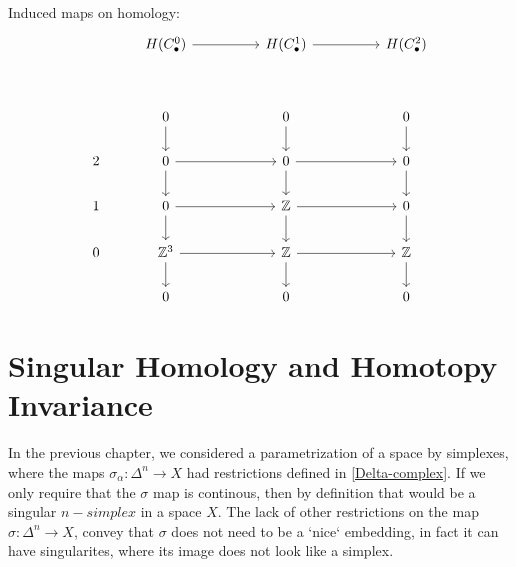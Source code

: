\documentclass[11pt,a4paper]{report}
\begin{document}
        Induced maps on homology:
       \[             
     \begin{tikzcd}[ampersand replacement=\&]
            \& H(C_\bullet^0)   \arrow[rr]                                     \&  \& H(C_\bullet^1) \arrow[rr]                               \&  \& H(C_\bullet^2)                                                                 \\ \\
            \& 0 \arrow[d]                                         \&  \& 0 \arrow[d]                                         \&  \& 0 \arrow[d]                                                                 \\ 
            2 \& 0 \arrow[rr] \arrow[d]            \&  \& 0 \arrow[rr] \arrow[d]            \&  \& 0 \arrow[d] \\
            1 \& 0 \arrow[d] \arrow[rr]            \&  \& \mathbb{Z} \arrow[rr] \arrow[d]                   \&  \& 0 \arrow[d]                                              \\
            0 \& \mathbb{Z}^3 \arrow[d] \arrow[rr] \&  \& \mathbb{Z} \arrow[rr] \arrow[d] \&  \& \mathbb{Z} \arrow[d]                                    \\
            \& 0                                                   \&  \& 0                                                   \&  \& 0                                                                          
    \end{tikzcd}
         \]           
                    
     \chapter{Singular Homology and Homotopy Invariance}
     
     
     In the previous chapter, we considered a parametrization of a space by simplexes, where the maps $\sigma_\alpha: \Delta^n \rightarrow X$ had restrictions defined in \ref{Delta-complex}. If we only require that the $\sigma$ map is continous, then by definition that would be a singular $n-simplex$ in a space $X$.
     The lack of other restrictions on the map $\sigma: \Delta^n \rightarrow X$, convey that $\sigma$ does not need to be a `nice` embedding, in fact it can have singularites, where its image does not look like a simplex.
     
\end{document}
